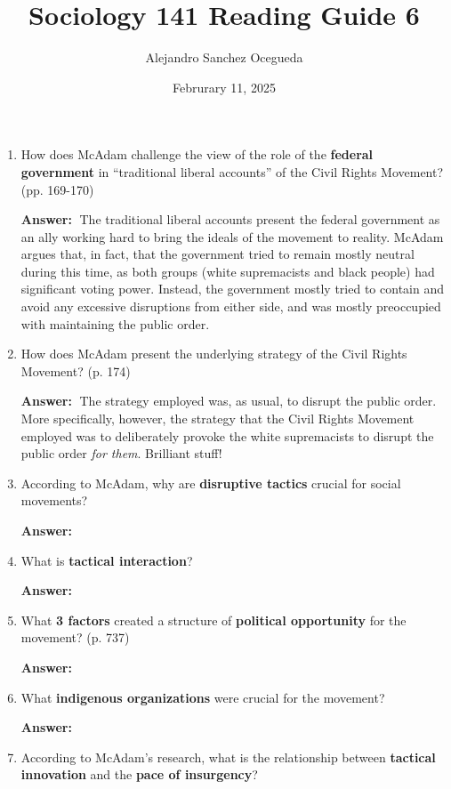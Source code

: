 \documentclass{article}
\title{Sociology 141 Reading Guide 6}
\author{Alejandro Sanchez Ocegueda}
\date{Februrary 11, 2025}
\newcommand{\answer}{\textbf{Answer:}$\;$}
\begin{document}
\maketitle

\begin{enumerate}[label=\arabic*)]
    \item How does McAdam challenge the view of the role of the \textbf{federal government} in ``traditional liberal accounts'' of the Civil Rights Movement? (pp. 169-170)
    
    \answer 
    The traditional liberal accounts present the federal government as an ally working hard to bring the ideals of the movement to reality.
    McAdam argues that, in fact, that the government tried to remain mostly neutral during this time, as both groups (white supremacists and black people) had significant voting power.
    Instead, the government mostly tried to contain and avoid any excessive disruptions from either side, and was mostly preoccupied with maintaining the public order.
    
    
    \item How does McAdam present the underlying strategy of the Civil Rights Movement? (p. 174)
    
    \answer 
    The strategy employed was, as usual, to disrupt the public order.
    More specifically, however, the strategy that the Civil Rights Movement employed was to deliberately provoke the white supremacists to disrupt the public order \textit{for them}.
    Brilliant stuff!
    
    
    \item According to McAdam, why are \textbf{disruptive tactics} crucial for social movements?
   
    \answer
    
    \item What is \textbf{tactical interaction}?
    
    \answer 
    
    \item What \textbf{3 factors} created a structure of \textbf{political opportunity} for the movement? (p. 737)
    
    \answer
    

    \item What \textbf{indigenous organizations} were crucial for the movement?
    
    \answer
    
    \item According to McAdam's research, what is the relationship between \textbf{tactical innovation} and the \textbf{pace of insurgency}?
    

\end{enumerate}
\end{document}
